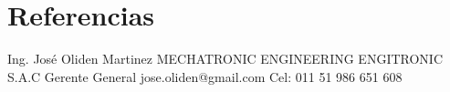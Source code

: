 \section{Referencias}

{Ing. José Oliden Martinez}
{MECHATRONIC ENGINEERING ENGITRONIC S.A.C Gerente General}
{jose.oliden@gmail.com}{}
{Cel: 011 51 986 651 608}